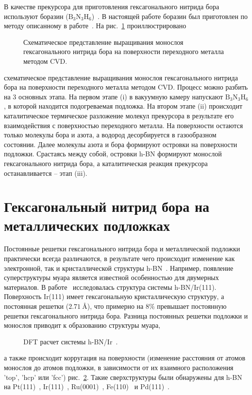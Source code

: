 В качестве прекурсора для приготовления гексагонального нитрида бора 
используют боразин ($\mathrm{B_3N_3H_6}$)~\cite{Orlando2012}. В настоящей
работе боразин был приготовлен по методу описанному в работе~\cite{Wideman1995}. На рис.~\ref{pic:CVD_BN} проиллюстрировано 
\begin{figure}[!ht]
\caption{Схематическое представление выращивания монослоя гексагонального
нитрида бора на поверхности переходного металла методом CVD.}
\label{pic:CVD_BN}
\end{figure}
схематическое представление выращивания монослоя гексагонального
нитрида бора на поверхности переходного металла методом CVD. Процесс можно 
разбить на 3 основных этапа. На первом этапе (i) в вакуумную камеру напускают
$\mathrm{B_3N_3H_6}$, в которой находится подогреваемая подложка. На втором
этапе (ii) происходит каталитическое термическое разложение молекул прекурсора
в результате его взаимодействия с поверхностью переходного металла. На поверхности остаются только молекулы бора и азота, а
водород десорбируется в газообразном состоянии. Далее молекулы азота и бора
формируют островки на поверхности подложки. Срастаясь между собой, островки
h-BN формируют монослой гексагонального нитрида бора, а каталитическая
реакция прекурсора останавливается -- этап (iii). 



\section{Гексагональный нитрид бора на металлических подложках}

Постоянные решетки гексагонального нитрида бора и металлической подложки
практически всегда различаются, в результате чего происходит изменение
как электронной, так и кристаллической структуры h-BN~\cite{Preobrajenski2007_h-BN_monolayer_on_metals}.
Например, появление суперструктуры муара является известной особенностью
для двумерных материалов. В работе~\cite{FarwickzumHagen2016} 
исследовалась структура 
системы h-BN/Ir(111). Поверхность Ir(111) имеет гексагональную 
кристаллическую структуру, а постоянная решетки ($2.71~\si{\angstrom}$),
что примерно на 8\% превышает постоянную решетки гексагонального нитрида бора.
Разница постоянных решетки подложки и монослоя приводит к образованию 
структуры муара,
\begin{figure}[!ht]
\caption{DFT расчет системы h-BN/Ir~\cite{FarwickzumHagen2016}.}
\label{pic:BN_moir}
\end{figure}
а также происходит корругация на поверхности (изменение расстояния от атомов 
монослоя до атомов 
подложки, в зависимости от их взаимного расположения 'top', 'hcp' или 'fcc') 
рис.~\ref{pic:BN_moir}.
Такие сверхструктуры были обнаружены для h-BN на Pt(111)~\cite{Cavar2008},
Ir(111)~\cite{FarwickzumHagen2016,Preobrajenski2008_Adsorption-inducedgapstatesofh-BNonmetalsurfaces,
Usachov2012, Orlando2012},
Ru(0001)~\cite{Brugger2009}, Fe(110)~\cite{Vinogradov2012} и Pd(111)~\cite{Nagashima1995}.


